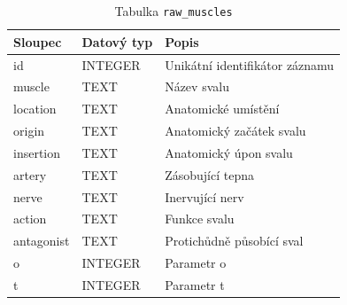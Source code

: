 \begin{table}[ht!]
    \centering
    \begin{tabularx}{\textwidth}{|l|l|L|}
        \hline
        \textbf{Sloupec} & \textbf{Datový typ} & \textbf{Popis}                 \\ \hline
        id               & INTEGER             & Unikátní identifikátor záznamu \\ \hline
        muscle           & TEXT                & Název svalu                    \\ \hline
        location         & TEXT                & Anatomické umístění            \\ \hline
        origin           & TEXT                & Anatomický začátek svalu       \\ \hline
        insertion        & TEXT                & Anatomický úpon svalu          \\ \hline
        artery           & TEXT                & Zásobující tepna               \\ \hline
        nerve            & TEXT                & Inervující nerv                \\ \hline
        action           & TEXT                & Funkce svalu                   \\ \hline
        antagonist       & TEXT                & Protichůdně působící sval      \\ \hline
        o                & INTEGER             & Parametr o                     \\ \hline
        t                & INTEGER             & Parametr t                     \\ \hline
    \end{tabularx}
    \caption{Tabulka \texttt{raw\_muscles}}
    \label{tab:raw_muscles}
\end{table}
